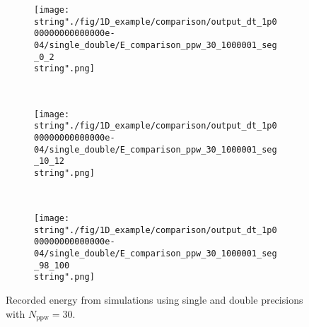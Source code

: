 \begin{minipage}[t]{.5\textwidth}
%
\begin{figure}[H]
\captionsetup{width=0.95\textwidth,font=footnotesize,labelfont=footnotesize}
\centering
%
\begin{subfigure}[b]{1\textwidth}
%
\centering\texttt{[image: \\string"./fig/1D\_example/comparison/output\_dt\_1p000000000000000e-04/single\_double/E\_comparison\_ppw\_30\_1000001\_seg\_0\_2\\string".png]}
%
\end{subfigure}\hfill
\\[2ex]
%
\begin{subfigure}[b]{1\textwidth}
%
\centering\texttt{[image: \\string"./fig/1D\_example/comparison/output\_dt\_1p000000000000000e-04/single\_double/E\_comparison\_ppw\_30\_1000001\_seg\_10\_12\\string".png]}
%
\end{subfigure}\hfill
\\[2ex]
%
\begin{subfigure}[b]{1\textwidth}
%
\centering\texttt{[image: \\string"./fig/1D\_example/comparison/output\_dt\_1p000000000000000e-04/single\_double/E\_comparison\_ppw\_30\_1000001\_seg\_98\_100\\string".png]}
%
\end{subfigure}\hfill
%
\caption{Recorded energy from simulations using single and double precisions with $N_\text{ppw}=30$.}
\label{comparison_E_single_double_segments_ppw_30}
\end{figure}
%
\end{minipage}
